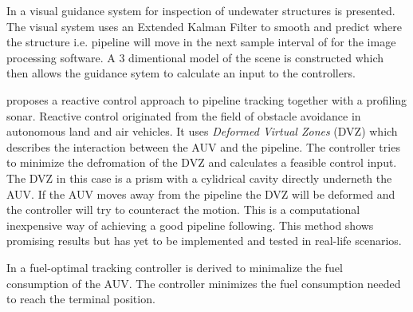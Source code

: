 	In \cite{Visual_inpsection_of_seabottom_by_AUV} a visual guidance system for inspection of undewater structures 
	is presented. The visual system uses an Extended Kalman Filter to smooth and predict where the structure i.e. 
	pipeline will move in the next sample interval of for the image processing software. A 3 dimentional model 
	of the scene is constructed which then allows the guidance sytem to calculate an input to the controllers.
	
	\cite{reactive_control_AUV} proposes a reactive control approach to pipeline tracking together with a 
	profiling sonar. Reactive control originated from the field of obstacle avoidance in autonomous land and air 
	vehicles. It uses \textit{Deformed Virtual Zones} (DVZ) which describes the interaction between the AUV and 
	the pipeline. The controller tries to minimize the defromation of the DVZ and calculates a feasible control input. 
	The DVZ in this case is a prism with a cylidrical cavity directly underneth the AUV. If the AUV moves away from 
	the pipeline the DVZ will be deformed and the controller will try to counteract the motion. This is a 
	computational inexpensive way of achieving a good pipeline following. This method shows promising results 
	but has yet to be implemented and tested in real-life scenarios. 
	
	In \cite{fuel_optimal_control} a fuel-optimal tracking controller is derived to minimalize the fuel consumption 
	of the AUV. The controller minimizes the fuel consumption needed to reach the terminal position. 
	
	


